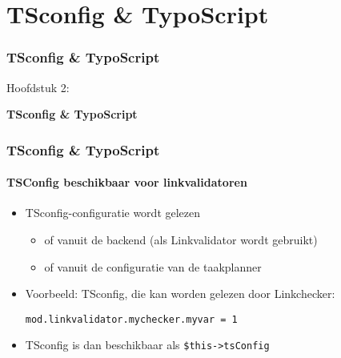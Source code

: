 %

\section{TSconfig \& TypoScript}
\begin{frame}[fragile]
	\frametitle{TSconfig \& TypoScript}

	\begin{center}\huge{Hoofdstuk 2:}\end{center}
	\begin{center}\huge{\color{typo3darkgrey}\textbf{TSconfig \& TypoScript}}\end{center}

\end{frame}


\begin{frame}[fragile]
	\frametitle{TSconfig \& TypoScript}
	\framesubtitle{TSConfig beschikbaar voor linkvalidatoren}

	\begin{itemize}
		\item TSconfig-configuratie wordt gelezen

			\begin{itemize}
				\item of vanuit de backend (als Linkvalidator wordt gebruikt)
				\item of vanuit de configuratie van de taakplanner
			\end{itemize}

		\item Voorbeeld: TSconfig, die kan worden gelezen door Linkchecker:

			\lstinline!mod.linkvalidator.mychecker.myvar = 1!

		\item TSconfig is dan beschikbaar als \texttt{\$this->tsConfig}
	\end{itemize}

\end{frame}

